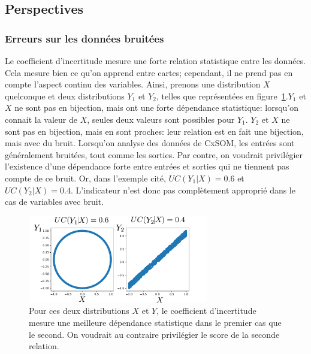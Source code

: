 
\subsection{Perspectives}

\subsubsection{Erreurs sur les données bruitées}

Le coefficient d'incertitude mesure une forte relation statistique entre les données. Cela mesure bien ce qu'on apprend entre cartes; cependant, il ne prend pas en compte l'aspect continu des variables. Ainsi, prenons une distribution $X$ quelconque et deux distributions $Y_1$ et $Y_2$, telles que représentées en figure~\ref{fig:exemple-limite}.$Y_1$ et $X$ ne sont pas en bijection, mais ont une forte dépendance statistique: lorsqu'on connait la valeur de $X$, seules deux valeurs sont possibles pour $Y_1$.
$Y_2$ et $X$ ne sont pas en bijection, mais en sont proches: leur relation est en fait une bijection, mais avec du bruit. Lorsqu'on analyse des données de CxSOM, les entrées sont généralement bruitées, tout comme les sorties. Par contre, on voudrait privilégier l'existence d'une dépendance forte entre entrées et sorties qui ne tiennent pas compte de ce bruit. Or, dans l'exemple cité, $UC(Y_1|X) = 0.6$ et $UC(Y_2|X) = 0.4$. L'indicateur n'est donc pas complètement approprié dans le cas de variables avec bruit.

\begin{figure}
\centering
\includegraphics[width=0.7\textwidth]{exemple_limite.pdf}
\caption{Pour ces deux distributions $X$ et $Y$, le coefficient d'incertitude mesure une meilleure dépendance statistique dans le premier cas que le second. On voudrait au contraire privilégier le score de la seconde relation.}
\label{fig:exemple-limite}
\end{figure}

